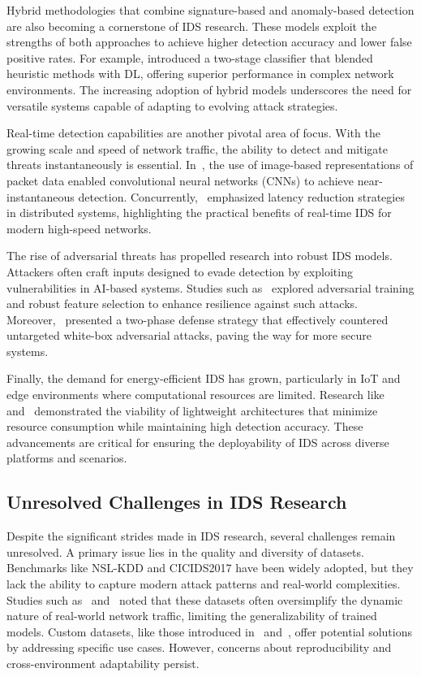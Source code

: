 Hybrid methodologies that combine signature-based and anomaly-based detection are also becoming a cornerstone of IDS research. These models exploit the strengths of both approaches to achieve higher detection accuracy and lower false positive rates. For example, \cite{Mohammad2024} introduced a two-stage classifier that blended heuristic methods with DL, offering superior performance in complex network environments. The increasing adoption of hybrid models underscores the need for versatile systems capable of adapting to evolving attack strategies.

Real-time detection capabilities are another pivotal area of focus. With the growing scale and speed of network traffic, the ability to detect and mitigate threats instantaneously is essential. In~\cite{Ghadermazi2024}, the use of image-based representations of packet data enabled convolutional neural networks (CNNs) to achieve near-instantaneous detection. Concurrently,~\cite{Chen2024} emphasized latency reduction strategies in distributed systems, highlighting the practical benefits of real-time IDS for modern high-speed networks.

The rise of adversarial threats has propelled research into robust IDS models. Attackers often craft inputs designed to evade detection by exploiting vulnerabilities in AI-based systems. Studies such as~\cite{Alotaibi2023AML} explored adversarial training and robust feature selection to enhance resilience against such attacks. Moreover,~\cite{Roshan2024} presented a two-phase defense strategy that effectively countered untargeted white-box adversarial attacks, paving the way for more secure systems.

Finally, the demand for energy-efficient IDS has grown, particularly in IoT and edge environments where computational resources are limited. Research like~\cite{Gutierrez2023} and~\cite{Sowmya2023} demonstrated the viability of lightweight architectures that minimize resource consumption while maintaining high detection accuracy. These advancements are critical for ensuring the deployability of IDS across diverse platforms and scenarios.




\subsection{Unresolved Challenges in IDS Research}
Despite the significant strides made in IDS research, several challenges remain unresolved. A primary issue lies in the quality and diversity of datasets. Benchmarks like NSL-KDD and CICIDS2017 have been widely adopted, but they lack the ability to capture modern attack patterns and real-world complexities. Studies such as~\cite{Mirlekar2022} and~\cite{Jayalaxmi2022} noted that these datasets often oversimplify the dynamic nature of real-world network traffic, limiting the generalizability of trained models. Custom datasets, like those introduced in~\cite{Ghadermazi2024} and~\cite{aljuaid2024deep}, offer potential solutions by addressing specific use cases. However, concerns about reproducibility and cross-environment adaptability persist.

